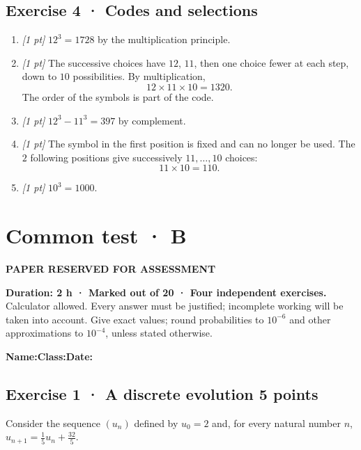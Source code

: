 \subsection*{Exercise 4 · Codes and selections}\begin{enumerate}

\item \textit{[1 pt]} $12^3=1728$ by the multiplication principle.

\item \textit{[1 pt]} The successive choices have $12$, $11$, then one choice fewer at each step, down to $10$ possibilities. By multiplication,
\[12\times11\times10=1320.\]
The order of the symbols is part of the code.

\item \textit{[1 pt]} $12^3-11^3=397$ by complement.

\item \textit{[1 pt]} The symbol in the first position is fixed and can no longer be used. The $2$ following positions give successively $11,\ldots,10$ choices:
\[11\times10=110.\]

\item \textit{[1 pt]} $10^3=1000$.

\end{enumerate}

\fi

\fi

\ifprof

\clearpage{}\label{sujet:3-4}

\section*{Common test · B}

{\sffamily\bfseries\color{amber}PAPER RESERVED FOR ASSESSMENT\par}

\textbf{Duration: 2 h · Marked out of 20 · Four independent exercises.}\\Calculator allowed. Every answer must be justified; incomplete working will be taken into account. Give exact values; round probabilities to $10^{-6}$ and other approximations to $10^{-4}$, unless stated otherwise.

\smallskip\textbf{Name:}\enspace\dotfill\quad\textbf{Class:}\enspace\dotfill\quad\textbf{Date:}\enspace\dotfill

\subsection*{Exercise 1 · A discrete evolution \hfill 5 points}Consider the sequence $(u_n)$ defined by $u_0=2$ and, for every natural number $n$, $u_{n+1}=\frac{1}{5}u_n+\frac{32}{5}$.


